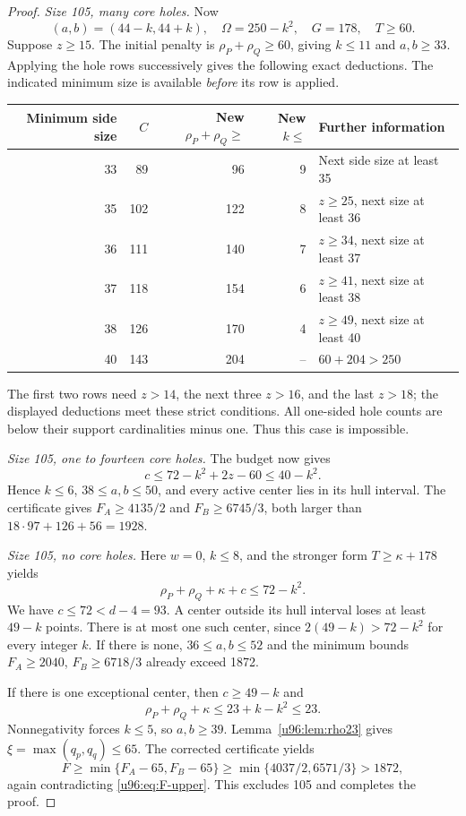 \documentclass[11pt,a4paper]{article}
\theoremstyle{remark}
\begin{document}
\begin{proof}
\emph{Size 105, many core holes.} Now
\[
 (a,b)=(44-k,44+k),\quad
 \Omega=250-k^2,\quad G=178,\quad T\geq60.
\]
Suppose $z\geq15$. The initial penalty is
$\rho_P+\rho_Q\geq60$, giving $k\leq11$ and $a,b\geq33$.
Applying the hole rows successively gives the following exact deductions.
The indicated minimum size is available \emph{before} its row is applied.
\begin{center}\small
\begin{tabular}{rrrrl}
\toprule
Minimum side size&$C$&New $\rho_P+\rho_Q\geq$&New $k\leq$&Further information\\
\midrule
33&89&96&9&Next side size at least 35\\
35&102&122&8&$z\geq25$, next size at least 36\\
36&111&140&7&$z\geq34$, next size at least 37\\
37&118&154&6&$z\geq41$, next size at least 38\\
38&126&170&4&$z\geq49$, next size at least 40\\
40&143&204&--&$60+204>250$\\
\bottomrule
\end{tabular}
\end{center}
The first two rows need $z>14$, the next three $z>16$, and the last
$z>18$; the displayed deductions meet these strict conditions. All
one-sided hole counts are below their support cardinalities minus one.
Thus this case is impossible.

\emph{Size 105, one to fourteen core holes.} The budget now gives
\[
 c\leq72-k^2+2z-60\leq40-k^2.
\]
Hence $k\leq6$, $38\leq a,b\leq50$, and every active center lies in its
hull interval. The certificate gives $F_A\geq4135/2$ and
$F_B\geq6745/3$, both larger than
$18\cdot97+126+56=1928$.

\emph{Size 105, no core holes.} Here $w=0$, $k\leq8$, and the stronger
form $T\geq\kappa+178$ yields
\begin{equation}
 \rho_P+\rho_Q+\kappa+c\leq72-k^2.\label{u96:eq:105-zero-budget}
\end{equation}
We have $c\leq72<d-4=93$. A center outside its hull interval loses at
least $49-k$ points. There is at most one such center, since
$2(49-k)>72-k^2$ for every integer $k$.
If there is none, $36\leq a,b\leq52$ and the minimum bounds
$F_A\geq2040$, $F_B\geq6718/3$ already exceed 1872.

If there is one exceptional center, then $c\geq49-k$ and
\[
 \rho_P+\rho_Q+\kappa\leq23+k-k^2\leq23.
\]
Nonnegativity forces $k\leq5$, so $a,b\geq39$.
Lemma~\ref{u96:lem:rho23} gives $\xi=\max(q_p,q_q)\leq65$.
The corrected certificate yields
\[
 F\geq\min\{F_A-65,F_B-65\}
 \geq\min\{4037/2,6571/3\}>1872,
\]
again contradicting \eqref{u96:eq:F-upper}. This excludes 105 and completes
the proof.
\end{proof}
\end{document}
